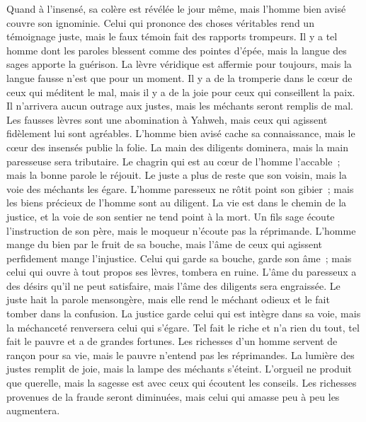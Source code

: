 \begin{multicols}{2}
Quand à l'insensé, sa colère est révélée le jour même, mais l'homme bien avisé couvre son ignominie.
Celui qui prononce des choses véritables rend un témoignage juste, mais le faux témoin fait des rapports trompeurs.
Il y a tel homme dont les paroles blessent comme des pointes d'épée, mais la langue des sages apporte la guérison.
La lèvre véridique est affermie pour toujours, mais la langue fausse n'est que pour un moment.
Il y a de la tromperie dans le cœur de ceux qui méditent le mal, mais il y a de la joie pour ceux qui conseillent la paix.
Il n'arrivera aucun outrage aux justes, mais les méchants seront remplis de mal.
Les fausses lèvres sont une abomination à Yahweh, mais ceux qui agissent fidèlement lui sont agréables.
L'homme bien avisé cache sa connaissance, mais le cœur des insensés publie la folie.
La main des diligents dominera, mais la main paresseuse sera tributaire.
Le chagrin qui est au cœur de l'homme l'accable~; mais la bonne parole le réjouit.
Le juste a plus de reste que son voisin, mais la voie des méchants les égare.
L'homme paresseux ne rôtit point son gibier~; mais les biens précieux de l'homme sont au diligent.
La vie est dans le chemin de la justice, et la voie de son sentier ne tend point à la mort.
\VerseOne{}Un fils sage écoute l'instruction de son père, mais le moqueur n'écoute pas la réprimande.
L'homme mange du bien par le fruit de sa bouche, mais l'âme de ceux qui agissent perfidement mange l'injustice.
Celui qui garde sa bouche, garde son âme~; mais celui qui ouvre à tout propos ses lèvres, tombera en ruine.
L'âme du paresseux a des désirs qu'il ne peut satisfaire, mais l'âme des diligents sera engraissée.
Le juste hait la parole mensongère, mais elle rend le méchant odieux et le fait tomber dans la confusion.
La justice garde celui qui est intègre dans sa voie, mais la méchanceté renversera celui qui s'égare.
Tel fait le riche et n'a rien du tout, tel fait le pauvre et a de grandes fortunes.
Les richesses d'un homme servent de rançon pour sa vie, mais le pauvre n'entend pas les réprimandes.
La lumière des justes remplit de joie, mais la lampe des méchants s'éteint.
L'orgueil ne produit que querelle, mais la sagesse est avec ceux qui écoutent les conseils.
Les richesses provenues de la fraude seront diminuées, mais celui qui amasse peu à peu les augmentera.

\end{multicols}
